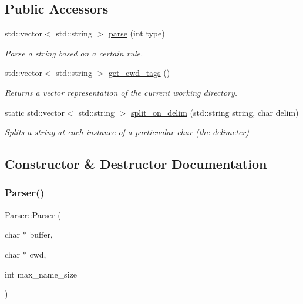 \subsection*{Public Accessors}
\begin{DoxyCompactItemize}
\item 
std\+::vector$<$ std\+::string $>$ \mbox{\hyperlink{classParser_a5b531e9ed867eeb8ccb9cb088cf35c24}{parse}} (int type)
\begin{DoxyCompactList}\small\item\em Parse a string based on a certain rule. \end{DoxyCompactList}\item 
std\+::vector$<$ std\+::string $>$ \mbox{\hyperlink{classParser_aa973764b863dfbe448fa2fd7aa9ffdaa}{get\+\_\+cwd\+\_\+tags}} ()
\begin{DoxyCompactList}\small\item\em Returns a vector representation of the current working directory. \end{DoxyCompactList}\item 
static std\+::vector$<$ std\+::string $>$ \mbox{\hyperlink{classParser_a71c87961db9707dc18db00a645d3d1e5}{split\+\_\+on\+\_\+delim}} (std\+::string string, char delim)
\begin{DoxyCompactList}\small\item\em Splits a string at each instance of a particualar char (the delimeter) \end{DoxyCompactList}\end{DoxyCompactItemize}


\subsection{Constructor \& Destructor Documentation}
\mbox{\label{classParser_a306c6c33d7a6cf1bb682be360fcfe982}} 
\subsubsection{\texorpdfstring{Parser()}{Parser()}\hspace{0.1cm}{\footnotesize\ttfamily [1/4]}}
{\footnotesize\ttfamily Parser\+::\+Parser (\begin{DoxyParamCaption}\item[{char $\ast$}]{buffer,  }\item[{char $\ast$}]{cwd,  }\item[{int}]{max\+\_\+name\+\_\+size }\end{DoxyParamCaption})}

